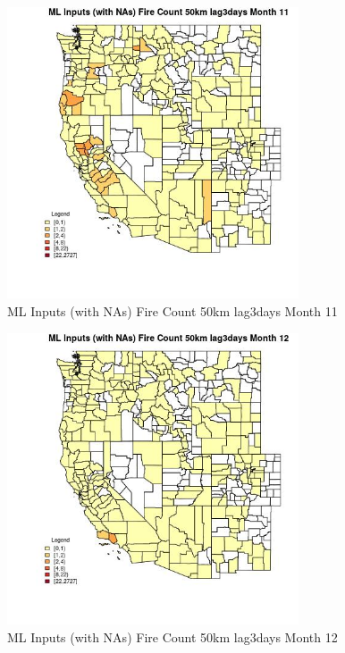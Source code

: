 \begin{figure} 
\centering  
\includegraphics[width=0.77\textwidth]{Code_Outputs/Report_ML_input_PM25_Step4_part_f_de_duplicated_aves_prioritize_24hr_obswNAs_CountyFire_Count_50km_lag3daysmedianMonth11.jpg} 
\caption{\label{fig:Report_ML_input_PM25_Step4_part_f_de_duplicated_aves_prioritize_24hr_obswNAsCountyFire_Count_50km_lag3daysmedianMonth11}ML Inputs (with NAs) Fire Count 50km lag3days Month 11} 
\end{figure} 
 

\begin{figure} 
\centering  
\includegraphics[width=0.77\textwidth]{Code_Outputs/Report_ML_input_PM25_Step4_part_f_de_duplicated_aves_prioritize_24hr_obswNAs_CountyFire_Count_50km_lag3daysmedianMonth12.jpg} 
\caption{\label{fig:Report_ML_input_PM25_Step4_part_f_de_duplicated_aves_prioritize_24hr_obswNAsCountyFire_Count_50km_lag3daysmedianMonth12}ML Inputs (with NAs) Fire Count 50km lag3days Month 12} 
\end{figure} 
 


